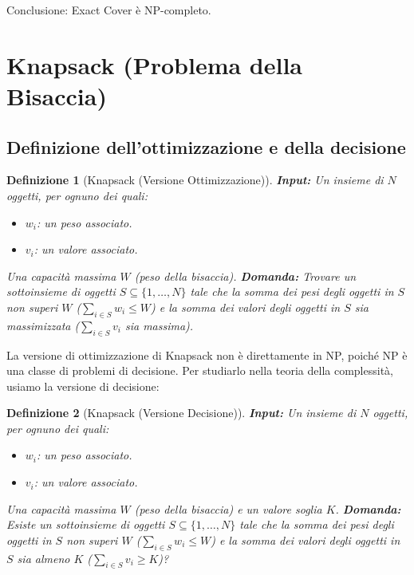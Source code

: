 \documentclass[a4paper]{article}
\newtheorem{definition}{Definizione}
\begin{document}
Conclusione: Exact Cover è NP-completo.

\section{Knapsack (Problema della Bisaccia)}

\subsection{Definizione dell'ottimizzazione e della decisione}

\begin{definition}[Knapsack (Versione Ottimizzazione)]
\textbf{Input:}
Un insieme di $N$ oggetti, per ognuno dei quali:
\begin{itemize}
    \item $w_i$: un peso associato.
    \item $v_i$: un valore associato.
\end{itemize}
Una capacità massima $W$ (peso della bisaccia).
\textbf{Domanda:} Trovare un sottoinsieme di oggetti $S \subseteq \{1, \ldots, N\}$ tale che la somma dei pesi degli oggetti in $S$ non superi $W$ ($\sum_{i \in S} w_i \le W$) e la somma dei valori degli oggetti in $S$ sia massimizzata ($\sum_{i \in S} v_i$ sia massima).
\end{definition}

La versione di ottimizzazione di Knapsack non è direttamente in NP, poiché NP è una classe di problemi di decisione. Per studiarlo nella teoria della complessità, usiamo la versione di decisione:

\begin{definition}[Knapsack (Versione Decisione)]
\textbf{Input:}
Un insieme di $N$ oggetti, per ognuno dei quali:
\begin{itemize}
    \item $w_i$: un peso associato.
    \item $v_i$: un valore associato.
\end{itemize}
Una capacità massima $W$ (peso della bisaccia) e un valore soglia $K$.
\textbf{Domanda:} Esiste un sottoinsieme di oggetti $S \subseteq \{1, \ldots, N\}$ tale che la somma dei pesi degli oggetti in $S$ non superi $W$ ($\sum_{i \in S} w_i \le W$) e la somma dei valori degli oggetti in $S$ sia almeno $K$ ($\sum_{i \in S} v_i \ge K$)?
\end{definition}
\end{document}
